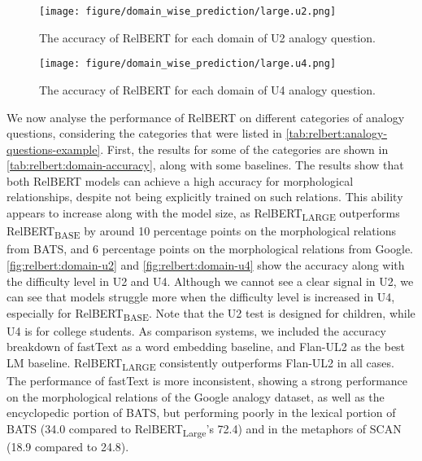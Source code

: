 \documentclass[3p]{elsarticle}
\begin{document}
{\begin{figure}[!t]
    \centering
    \texttt{[image: figure/domain\_wise\_prediction/large.u2.png]}
    \caption{The accuracy of RelBERT for each domain of U2 analogy question.}
    \label{fig:relbert:domain-u2}
\end{figure}

\begin{figure}[!t]
    \centering
    \texttt{[image: figure/domain\_wise\_prediction/large.u4.png]}
    \caption{The accuracy of RelBERT for each domain of U4 analogy question.}
    \label{fig:relbert:domain-u4}
\end{figure}

We now analyse the performance of RelBERT on different categories of analogy questions, considering the categories that were listed in \autoref{tab:relbert:analogy-questions-example}. First, the results for some of the categories are shown in \autoref{tab:relbert:domain-accuracy}, along with some baselines. The results show that both RelBERT models can achieve a high accuracy for morphological relationships, despite not being explicitly trained on such relations. This ability appears to increase along with the model size, as RelBERT\textsubscript{LARGE} outperforms RelBERT\textsubscript{BASE} by around 10 percentage points on the morphological relations from BATS, and 6 percentage points on the morphological relations from Google. \autoref{fig:relbert:domain-u2} and \autoref{fig:relbert:domain-u4} show the accuracy along with the difficulty level in U2 and U4. Although we cannot see a clear signal in U2, we can see that models struggle more when the difficulty level is increased in U4, especially for RelBERT\textsubscript{BASE}. Note that the U2 test is designed for children, while U4 is for college students. 
As comparison systems, we included the accuracy breakdown of fastText as a word embedding baseline, and Flan-UL2 as the best LM baseline. RelBERT\textsubscript{LARGE} consistently outperforms  Flan-UL2 in all cases. The performance of fastText is more inconsistent, showing a strong performance on the morphological relations of the Google analogy dataset, as well as the encyclopedic portion of BATS, but performing poorly in the lexical portion of BATS (34.0 compared to RelBERT\textsubscript{Large}'s 72.4) and in the metaphors of SCAN (18.9 compared to 24.8).

}
\end{document}
